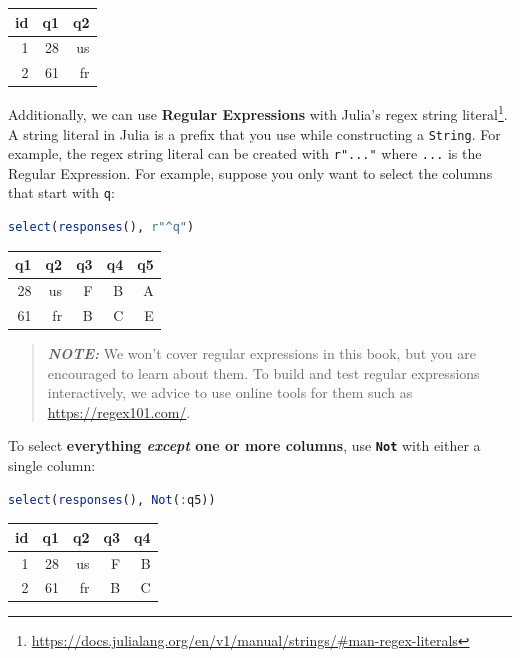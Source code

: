 \documentclass[
  notoc %
]{tufte-book}
\DeclareRobustCommand{\href}[2]{#2\footnote{\url{#1}}}
\newcommand{\passthrough}[1]{#1}
\begin{document}
\begin{longtable}[]{@{}rrr@{}}
\toprule
id & q1 & q2 \\
\midrule
\endhead
1 & 28 & us \\
2 & 61 & fr \\
\bottomrule
\end{longtable}

Additionally, we can use \textbf{Regular Expressions} with
\href{https://docs.julialang.org/en/v1/manual/strings/\#man-regex-literals}{Julia's
regex string literal}. A string literal in Julia is a prefix that you
use while constructing a \passthrough{\lstinline!String!}. For example,
the regex string literal can be created with
\passthrough{\lstinline!r"..."!} where \passthrough{\lstinline!...!} is
the Regular Expression. For example, suppose you only want to select the
columns that start with \passthrough{\lstinline!q!}:

\begin{lstlisting}[language=Julia]
select(responses(), r"^q")
\end{lstlisting}

\begin{longtable}[]{@{}rrrrr@{}}
\toprule
q1 & q2 & q3 & q4 & q5 \\
\midrule
\endhead
28 & us & F & B & A \\
61 & fr & B & C & E \\
\bottomrule
\end{longtable}

\begin{quote}
\textbf{\emph{NOTE:}} We won't cover regular expressions in this book,
but you are encouraged to learn about them. To build and test regular
expressions interactively, we advice to use online tools for them such
as \url{https://regex101.com/}.
\end{quote}

To select \textbf{everything \emph{except} one or more columns}, use
\textbf{\passthrough{\lstinline!Not!}} with either a single column:

\begin{lstlisting}[language=Julia]
select(responses(), Not(:q5))
\end{lstlisting}

\begin{longtable}[]{@{}rrrrr@{}}
\toprule
id & q1 & q2 & q3 & q4 \\
\midrule
\endhead
1 & 28 & us & F & B \\
2 & 61 & fr & B & C \\
\bottomrule
\end{longtable}
\end{document}
